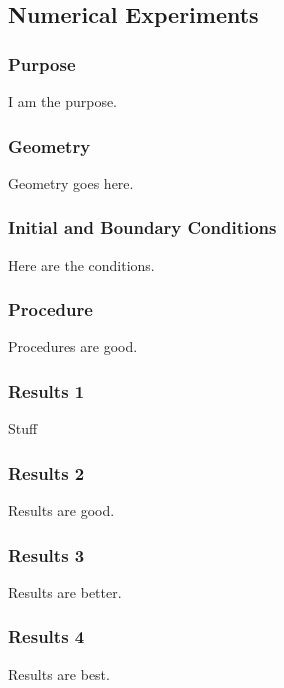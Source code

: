 \documentclass[compress]{beamer}
\begin{document}
\subsection[Experiments]{Numerical Experiments}
\begin{frame}
\frametitle{Purpose}

I am the purpose.

\end{frame}
\begin{frame}
\frametitle{Geometry}

Geometry goes here.

\end{frame}
\begin{frame}
\frametitle{Initial and Boundary Conditions}

Here are the conditions.

\end{frame}
\begin{frame}
\frametitle{Procedure}

Procedures are good.

\end{frame}
\begin{frame}
\frametitle{Results 1}

Stuff

\end{frame}
\begin{frame}
\frametitle{Results 2}

Results are good.

\end{frame}
\begin{frame}
\frametitle{Results 3}

Results are better.

\end{frame}
\begin{frame}
\frametitle{Results 4}

Results are best.

\end{frame}
\end{document}
